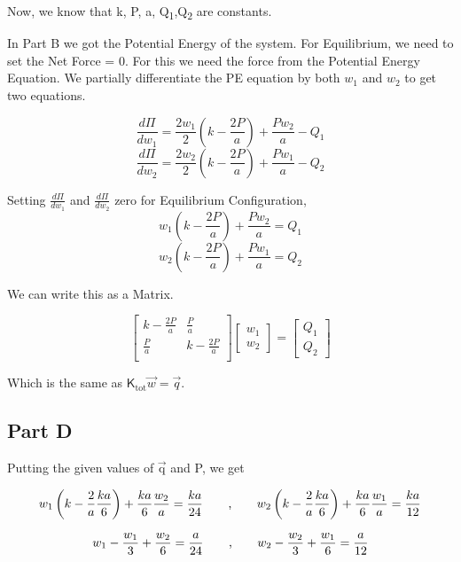 \documentclass[12pt,a4paper]{article}
\newcommand{\mat}[1]{\boldsymbol { \mathsf{#1}} }
\begin{document}
Now, we know that k, P, a, Q\textsubscript{1},Q\textsubscript{2} are constants.


In Part B we got the Potential Energy of the system. For Equilibrium, we need to set the Net Force = 0. For this we need the force from the Potential Energy Equation. We partially differentiate the PE equation by both $w_1$ and $w_2$ to get two equations.

$$
\frac{d\Pi}{dw_1} = \frac{2w_1}{2}\left(k-\frac{2P}{a}\right) + \frac{Pw_2}{a} - Q_1$$
$$\frac{d\Pi}{dw_2} = \frac{2w_2}{2}\left(k-\frac{2P}{a}\right) + \frac{Pw_1}{a} - Q_2
$$

Setting $\frac{d\Pi}{dw_1}$ and $\frac{d\Pi}{dw_2}$ zero for Equilibrium Configuration,
$$w_1\left(k-\frac{2P}{a}\right) + \frac{Pw_2}{a} = Q_1 $$
$$w_2\left(k-\frac{2P}{a}\right) + \frac{Pw_1}{a} = Q_2 $$

We can write this as a Matrix.

$$
\begin{bmatrix}
k-\frac{2P}{a} & \frac{P}{a}\\
\frac{P}{a} & k-\frac{2P}{a}\\
\end{bmatrix}\begin{bmatrix}w_1\\ w_2\end{bmatrix} = \begin{bmatrix}Q_1 \\ Q_2\end{bmatrix}
$$

Which is the same as $\mat{K}_\text{tot} \Vec{w} = \Vec{q}$.

\subsection{Part D}

Putting the given values of $\Vec{\text{q}}$ and P, we get

$$w_1\left(k-\frac{2}{a}\frac{ka}{6}\right) + \frac{ka}{6}\frac{w_2}{a} = \frac{ka}{24} \text{  \hspace{0.6cm},\hspace{0.6cm} } w_2\left(k-\frac{2}{a}\frac{ka}{6}\right) + \frac{ka}{6}\frac{w_1}{a} = \frac{ka}{12} $$

$$w_1 - \frac{w_1}{3} + \frac{w_2}{6} = \frac{a}{24} \text{  \hspace{0.6cm},\hspace{0.6cm} } w_2-\frac{w_2}{3} + \frac{w_1}{6} = \frac{a}{12} $$
\end{document}
